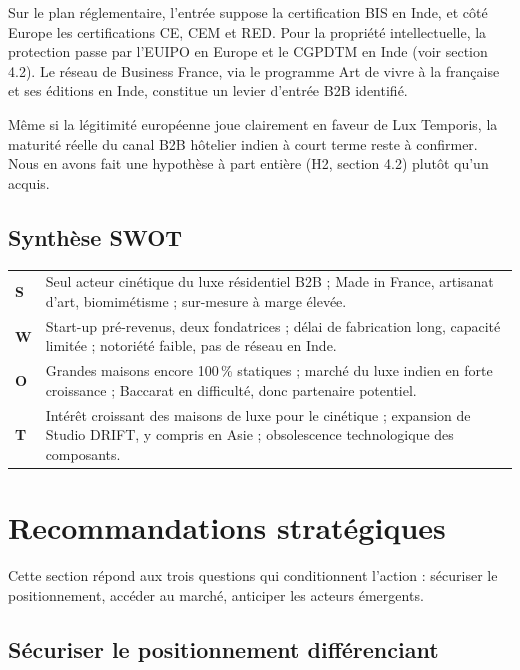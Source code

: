 \documentclass[11pt,a4paper]{article}
\begin{document}
Sur le plan réglementaire, l'entrée suppose la certification BIS en Inde, et côté Europe les certifications CE, CEM et RED. Pour la propriété intellectuelle, la protection passe par l'EUIPO en Europe et le CGPDTM en Inde (voir section 4.2). Le réseau de Business France, via le programme \og Art de vivre à la française \fg{} et ses éditions en Inde, constitue un levier d'entrée B2B identifié.

Même si la légitimité européenne joue clairement en faveur de Lux Temporis, la maturité réelle du canal B2B hôtelier indien à court terme reste à confirmer. Nous en avons fait une hypothèse à part entière (H2, section 4.2) plutôt qu'un acquis.

\subsection{Synthèse SWOT}

\begin{center}
\begin{tabularx}{\linewidth}{L{1.2cm} X}
\toprule
\textbf{S} & Seul acteur cinétique du luxe résidentiel B2B ; Made in France, artisanat d'art, biomimétisme ; sur-mesure à marge élevée. \\
\addlinespace
\textbf{W} & Start-up pré-revenus, deux fondatrices ; délai de fabrication long, capacité limitée ; notoriété faible, pas de réseau en Inde. \\
\addlinespace
\textbf{O} & Grandes maisons encore 100\,\% statiques ; marché du luxe indien en forte croissance ; Baccarat en difficulté, donc partenaire potentiel. \\
\addlinespace
\textbf{T} & Intérêt croissant des maisons de luxe pour le cinétique ; expansion de Studio DRIFT, y compris en Asie ; obsolescence technologique des composants. \\
\bottomrule
\end{tabularx}
\end{center}

\newpage
\section{Recommandations stratégiques}

Cette section répond aux trois questions qui conditionnent l'action : sécuriser le positionnement, accéder au marché, anticiper les acteurs émergents.

\subsection{Sécuriser le positionnement différenciant}
\end{document}

